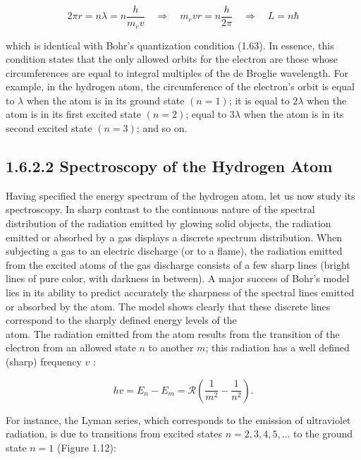 \documentclass[10pt]{article}
\begin{document}
\begin{equation*}
2 \pi r=n \lambda=n \frac{h}{m_{e} v} \quad \Longrightarrow \quad m_{e} v r=n \frac{h}{2 \pi} \quad \Longrightarrow \quad L=n \hbar \tag{1.78}
\end{equation*}


which is identical with Bohr's quantization condition (1.63). In essence, this condition states that the only allowed orbits for the electron are those whose circumferences are equal to integral multiples of the de Broglie wavelength. For example, in the hydrogen atom, the circumference of the electron's orbit is equal to $\lambda$ when the atom is in its ground state $(n=1)$; it is equal to $2 \lambda$ when the atom is in its first excited state $(n=2)$; equal to $3 \lambda$ when the atom is in its second excited state $(n=3)$; and so on.

\subsection*{1.6.2.2 Spectroscopy of the Hydrogen Atom}
Having specified the energy spectrum of the hydrogen atom, let us now study its spectroscopy. In sharp contrast to the continuous nature of the spectral distribution of the radiation emitted by glowing solid objects, the radiation emitted or absorbed by a gas displays a discrete spectrum distribution. When subjecting a gas to an electric discharge (or to a flame), the radiation emitted from the excited atoms of the gas discharge consists of a few sharp lines (bright lines of pure color, with darkness in between). A major success of Bohr's model lies in its ability to predict accurately the sharpness of the spectral lines emitted or absorbed by the atom. The model shows clearly that these discrete lines correspond to the sharply defined energy levels of the\\
atom. The radiation emitted from the atom results from the transition of the electron from an allowed state $n$ to another $m$; this radiation has a well defined (sharp) frequency $v$ :


\begin{equation*}
h v=E_{n}-E_{m}=\mathcal{R}\left(\frac{1}{m^{2}}-\frac{1}{n^{2}}\right) . \tag{1.79}
\end{equation*}


For instance, the Lyman series, which corresponds to the emission of ultraviolet radiation, is due to transitions from excited states $n=2,3,4,5, \ldots$ to the ground state $n=1$ (Figure 1.12):
\end{document}
